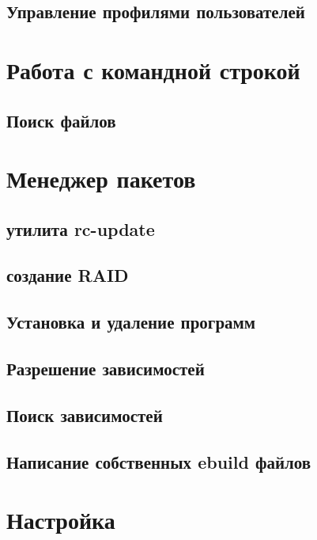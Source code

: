 \documentclass[12pt, a4paper]{article}
\begin{document}
\subsection{Управление профилями пользователей}

\newpage 

\section{Работа с командной строкой}

\subsection{Поиск файлов}

\newpage

\section{Менеджер пакетов}

\subsection{утилита rc-update}

\subsection{создание RAID}

\subsection{Установка и удаление программ}

\subsection{Разрешение зависимостей}

\subsection{Поиск зависимостей}

\subsection{Написание собственных ebuild файлов}

\newpage
\section{Настройка}
\end{document}
